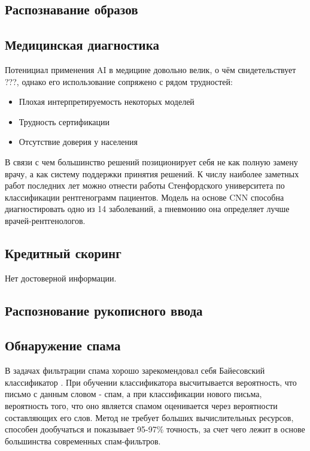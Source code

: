 \documentclass{article}
\begin{document}
    \subsection*{Распознавание образов}
    
    \subsection*{Медицинская диагностика}
        Потенициал применения AI в медицине довольно велик, о чём свидетельствует ???, однако его использование сопряжено с рядом трудностей:
        \begin{itemize}
            \item Плохая интерпретируемость некоторых моделей
            \item Трудность сертификации
            \item Отсутствие доверия у населения
        \end{itemize}
        В связи с чем большинство решений позиционирует себя не как полную замену врачу, а как систему поддержки принятия решений.
        К числу наиболее заметных работ последних лет можно отнести работы Стенфордского университета \citep{rajpurkar2017chexnet} по классификации рентгенограмм пациентов. Модель на основе CNN способна диагностировать одно из 14 заболеваний, а пневмонию она определяет лучше врачей-рентгенологов.
        
    \subsection*{Кредитный скоринг}
        Нет достоверной информации. 
    \subsection*{Распознование рукописного ввода}
    
    \subsection*{Обнаружение спама}
        В задачах фильтрации спама хорошо зарекомендовал себя Байесовский классификатор \citep{androutsopoulos2000evaluation}. При обучении классификатора высчитывается вероятность, что письмо с данным словом - спам, а при классификации нового письма, вероятность того, что оно является спамом оценивается через вероятности составляющих его слов. Метод не требует больших вычислительных ресурсов, способен дообучаться и показывает 95-97\% точность, за счет чего лежит в основе большинства современных спам-фильтров. 
\end{document}
